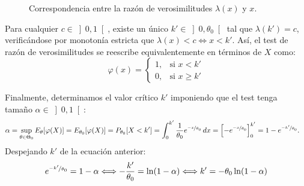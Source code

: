\begin{ejercicio}
\begin{figure}[ht]
        \caption{Correspondencia entre la razón de verosimilitudes $\lambda(x)$ y $x$.}
        \label{fig:razon_verosimilitudes_exponencial}
    \end{figure}

    Para cualquier $c \in \left]0, 1\right[$, existe un único $k' \in \left]0, \theta_0\right[$ tal que $\lambda(k') = c$, verificándose por monotonía estricta que $\lambda(x) < c \iff x < k'$. Así, el test de razón de verosimilitudes se reescribe equivalentemente en términos de $X$ como:
    \begin{equation*}
        \varphi(x) =
        \begin{cases}
            1, & \text{si } x < k' \\
            0, & \text{si } x \geq k'
        \end{cases}
    \end{equation*}

    Finalmente, determinamos el valor crítico $k'$ imponiendo que el test tenga tamaño $\alpha \in \left]0, 1\right[$:
    \begin{align*}
        \alpha &= \sup_{\theta \in \Theta_0} E_\theta[\varphi(X)] = E_{\theta_0}[\varphi(X)] = P_{\theta_0}[X < k'] = \int_{0}^{k'} \frac{1}{\theta_0} e^{\nicefrac{-x}{\theta_0}} \, dx = \left[-e^{\nicefrac{-x}{\theta_0}}\right]_{0}^{k'} = 1 - e^{\nicefrac{-k'}{\theta_0}}.
    \end{align*}
    Despejando $k'$ de la ecuación anterior:
    \begin{equation*}
        e^{\nicefrac{-k'}{\theta_0}} = 1 - \alpha \Longleftrightarrow -\frac{k'}{\theta_0} = \ln(1 - \alpha) \Longleftrightarrow k' = -\theta_0 \ln(1 - \alpha)
    \end{equation*}


\end{ejercicio}
